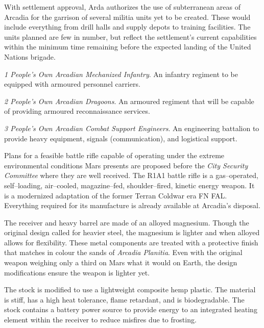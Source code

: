 With settlement approval, Arda authorizes the use of subterranean areas of Arcadia for the garrison of several militia units yet to be created. These would include everything from drill halls and supply depots to training facilities. The units planned are few in number, but reflect the settlement's current capabilities within the minimum time remaining before the expected landing of the United Nations brigade.

\startitemize[4]
\item {\it 1 People's Own Arcadian Mechanized Infantry}. An infantry regiment to be equipped with armoured personnel carriers.

\item {\it 2 People's Own Arcadian Dragoons}. An armoured regiment that will be capable of providing armoured reconnaissance services.

\item {\it 3 People's Own Arcadian Combat Support Engineers}. An engineering battalion to provide heavy equipment, signals (communication), and logistical support.
\stopitemize
\StopTimelineDate

Plans for a feasible battle rifle capable of operating under the extreme environmental conditions Mars presents are proposed before the {\it City Security Committee} where they are well received. The R1A1 battle rifle is a gas--operated, self--loading, air--cooled, magazine--fed, shoulder--fired, kinetic energy weapon. It is a modernized adaptation of the former Terran Coldwar era FN FAL. Everything required for its manufacture is already available at Arcadia's disposal.

The receiver and heavy barrel are made of an alloyed magnesium. Though the original design called for heavier steel, the magnesium is lighter and when alloyed allows for flexibility. These metal components are treated with a protective finish that matches in colour the sands of {\it Arcadia Planitia}. Even with the original weapon weighing only a third on Mars what it would on Earth, the design modifications ensure the weapon is lighter yet.

The stock is modified to use a lightweight composite hemp plastic. The material is stiff, has a high heat tolerance, flame retardant, and is biodegradable. The stock contains a battery power source to provide energy to an integrated heating element within the receiver to reduce misfires due to frosting.


